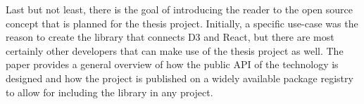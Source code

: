 Last but not least, there is the goal of introducing the reader to the open source concept that is planned for the thesis project. Initially, a specific use-case was the reason to create the library that connects D3 and React, but there are most certainly other developers that can make use of the thesis project as well. The paper provides a general overview of how the public API of the technology is designed and how the project is published on a widely available package registry to allow for including the library in any project.
